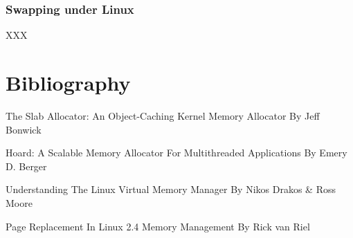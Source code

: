 
\begin{frame}
  \frametitle{Swapping under Linux}

  XXX
\end{frame}

%
%

\section{Bibliography}

\begin{thebibliography}{4}

The Slab Allocator: An Object-Caching Kernel Memory Allocator
\newblock By Jeff Bonwick

Hoard: A Scalable Memory Allocator For Multithreaded Applications
\newblock By Emery D. Berger

Understanding The Linux Virtual Memory Manager
\newblock By Nikos Drakos \& Ross Moore

Page Replacement In Linux 2.4 Memory Management
\newblock By Rick van Riel

\end{thebibliography}


